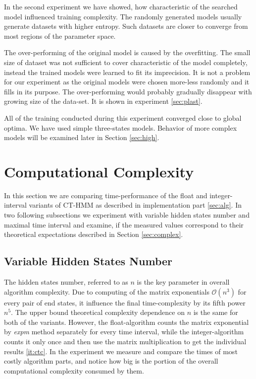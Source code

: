 \documentclass[thesis=M,english]{FITthesis}[2012/10/20]
\begin{document}
In the second experiment we have showed, how characteristic of the searched model influenced training complexity. The randomly generated models usually generate datasets with higher entropy. Such datasets are closer to converge from most regions of the parameter space. 

The over-performing of the original model is caused by the overfitting. The small size of dataset was not sufficient to cover characteristic of the model completely, instead the trained models were learned to fit its imprecision. It is not a problem for our experiment as the original models were chosen more-less randomly and it fills in its purpose. The over-performing would probably gradually disappear with growing size of the data-set. It is shown in experiment \ref{sec:plast}.

All of the training conducted during this experiment converged close to global optima. We have used simple three-states models. Behavior of more complex models will be examined later in Section \ref{sec:high}.    


\section{Computational Complexity}\label{sec:cc}

In this section we are comparing time-performance of the float and integer-interval variants of CT-HMM  as described in implementation part \ref{sec:alg}.
In two following subsections we experiment with variable hidden states number and maximal time interval and examine, if the measured values correspond to their theoretical expectations described in Section \ref{sec:complex}.

\subsection{Variable Hidden States Number}

The hidden states number, referred to as $n$ is the key parameter in overall algorithm complexity. Due to computing of the matrix exponentials $\mathcal{O}(n^3)$ for every pair of end states, it influence the final time-complexity by its fifth power $n^5$. The upper bound theoretical complexity dependence on $n$ is the same for both of the variants. However, the float-algorithm counts the matrix exponential by \textit{expm} method separately for every time interval, while the integer-algorithm counts it only once and then use the matrix multiplication to get the individual results \ref{it:ctc}. In the experiment we measure and compare the times of most costly algorithm parts, and notice how big is the portion of the overall computational complexity consumed by them. 
\end{document}
